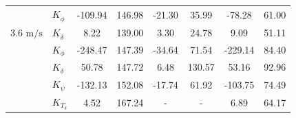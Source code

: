 \begin{table}[]
\begin{tabular}{llcccccc}
                                                   & $K_{\dot{\phi}} $                                                  & -109.94                                     & 146.98                                              & -21.30                                      & 35.99                                               & -78.28                                      & 61.00                                               \\
    \multirow{-2}{*}{3.6 $\si{\meter\per\second}$} & $K_{\dot{\delta}}$                                                 & 8.22                                        & 139.00                                              & 3.30                                        & 24.78                                               & 9.09                                        & 51.11                                               \\
                                                   & $K_{\phi} $                                                        & -248.47                                     & 147.39                                              & -34.64                                      & 71.54                                               & -229.14                                     & 84.40                                               \\
                                                   & $K_\delta $                                                        & 50.78                                       & 147.72                                              & 6.48                                        & 130.57                                              & 53.16                                       & 92.96                                               \\
                                                   & $K_\psi $                                                          & -132.13                                     & 152.08                                              & -17.74                                      & 61.92                                               & -103.75                                     & 74.49                                               \\
                                                   & $K_{T_\delta}$                                                     & 4.52                                        & 167.24                                              & -                                           & -                                                   & 6.89                                        & 64.17                                               \\ \cline{2-8} 

\end{tabular}
\end{table}
